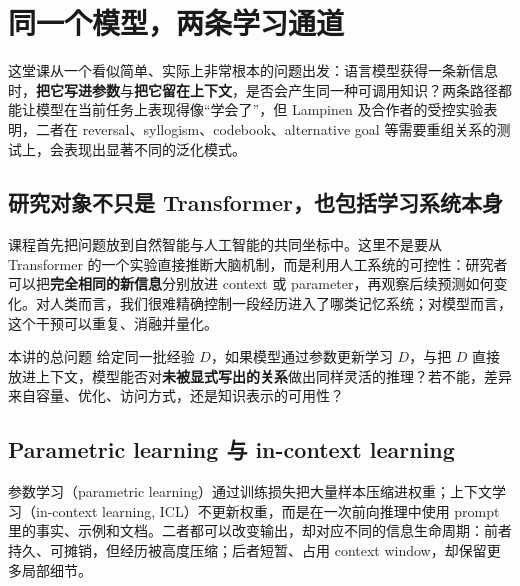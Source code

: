 \section{同一个模型，两条学习通道}

这堂课从一个看似简单、实际上非常根本的问题出发：语言模型获得一条新信息时，\textbf{把它写进参数}与\textbf{把它留在上下文}，是否会产生同一种可调用知识？两条路径都能让模型在当前任务上表现得像“学会了”，但 Lampinen 及合作者的受控实验表明，二者在 reversal、syllogism、codebook、alternative goal 等需要重组关系的测试上，会表现出显著不同的泛化模式。

\subsection{研究对象不只是 Transformer，也包括学习系统本身}

课程首先把问题放到自然智能与人工智能的共同坐标中。这里不是要从 Transformer 的一个实验直接推断大脑机制，而是利用人工系统的可控性：研究者可以把\textbf{完全相同的新信息}分别放进 context 或 parameter，再观察后续预测如何变化。对人类而言，我们很难精确控制一段经历进入了哪类记忆系统；对模型而言，这个干预可以重复、消融并量化。



\begin{importantbox}{本讲的总问题}
给定同一批经验 $D$，如果模型通过参数更新学习 $D$，与把 $D$ 直接放进上下文，模型能否对\textbf{未被显式写出的关系}做出同样灵活的推理？若不能，差异来自容量、优化、访问方式，还是知识表示的可用性？
\end{importantbox}

\subsection{Parametric learning 与 in-context learning}

参数学习（parametric learning）通过训练损失把大量样本压缩进权重；上下文学习（in-context learning, ICL）不更新权重，而是在一次前向推理中使用 prompt 里的事实、示例和文档。二者都可以改变输出，却对应不同的信息生命周期：前者持久、可摊销，但经历被高度压缩；后者短暂、占用 context window，却保留更多局部细节。

